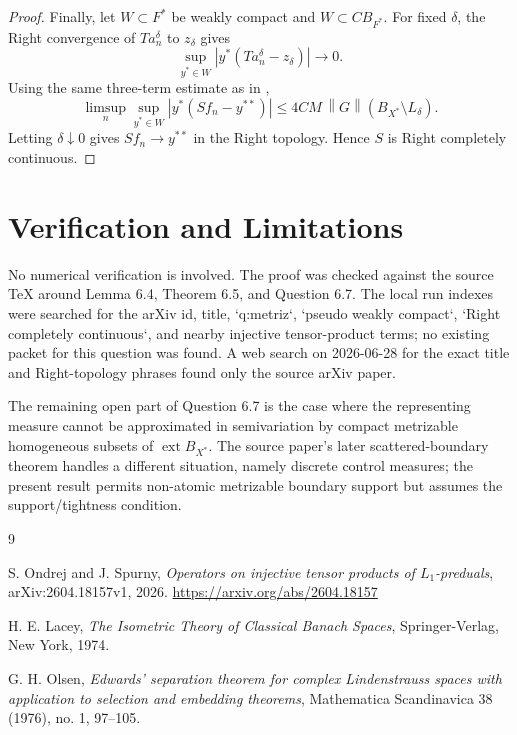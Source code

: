 \documentclass[11pt]{article}
\newcommand{\BX}{B_{X^*}}
\newcommand{\ext}{\operatorname{ext}}
\newcommand{\norm}[1]{\left\|#1\right\|}
\begin{document}
\begin{proof}
Finally, let \(W\subset F^*\) be weakly compact and \(W\subset C B_{F^*}\).  For fixed \(\delta\), the Right convergence of \(Ta_n^\delta\) to \(z_\delta\) gives
\[
  \sup_{y^*\in W}|y^*(Ta_n^\delta-z_\delta)|\to 0.
\]
Using the same three-term estimate as in \cite[Theorem 6.5(b)]{ondrej-spurny},
\[
\limsup_n\sup_{y^*\in W}|y^*(Sf_n-y^{**})|
\leq
4CM\,\norm{G}(\BX\setminus L_\delta).
\]
Letting \(\delta\downarrow 0\) gives \(Sf_n\to y^{**}\) in the Right topology.  Hence \(S\) is Right completely continuous.
\end{proof}

\section*{Verification and Limitations}

No numerical verification is involved.  The proof was checked against the source TeX around Lemma 6.4, Theorem 6.5, and Question 6.7.  The local run indexes were searched for the arXiv id, title, `q:metriz`, `pseudo weakly compact`, `Right completely continuous`, and nearby injective tensor-product terms; no existing packet for this question was found.  A web search on 2026-06-28 for the exact title and Right-topology phrases found only the source arXiv paper.

The remaining open part of Question 6.7 is the case where the representing measure cannot be approximated in semivariation by compact metrizable homogeneous subsets of \(\ext\BX\).  The source paper's later scattered-boundary theorem handles a different situation, namely discrete control measures; the present result permits non-atomic metrizable boundary support but assumes the support/tightness condition.

\begin{thebibliography}{9}

S. Ondrej and J. Spurny,
\emph{Operators on injective tensor products of \(L_1\)-preduals},
arXiv:2604.18157v1, 2026.
\url{https://arxiv.org/abs/2604.18157}

H. E. Lacey,
\emph{The Isometric Theory of Classical Banach Spaces},
Springer-Verlag, New York, 1974.

G. H. Olsen,
\emph{Edwards' separation theorem for complex Lindenstrauss spaces with application to selection and embedding theorems},
Mathematica Scandinavica 38 (1976), no. 1, 97--105.

\end{thebibliography}
\end{document}
